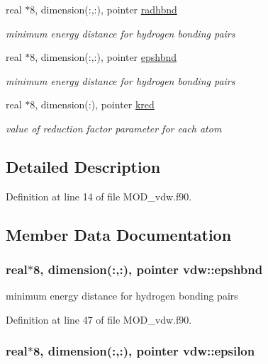 \begin{DoxyCompactItemize}
real $\ast$8, dimension(\-:,\-:), pointer \hyperlink{classvdw_ab306f3aa073b7317272454203b2dc5e7}{radhbnd}
\begin{DoxyCompactList}\small\item\em minimum energy distance for hydrogen bonding pairs \end{DoxyCompactList}\item 
real $\ast$8, dimension(\-:,\-:), pointer \hyperlink{classvdw_a9cb813f75d80f7bd7d0569e1ad7d92ad}{epshbnd}
\begin{DoxyCompactList}\small\item\em minimum energy distance for hydrogen bonding pairs \end{DoxyCompactList}\item 
real $\ast$8, dimension(\-:), pointer \hyperlink{classvdw_ad85a1ffa2bf6310e38c7a3fd6ac8256b}{kred}
\begin{DoxyCompactList}\small\item\em value of reduction factor parameter for each atom \end{DoxyCompactList}\end{DoxyCompactItemize}


\subsection{Detailed Description}


Definition at line 14 of file M\-O\-D\-\_\-vdw.\-f90.



\subsection{Member Data Documentation}
\hypertarget{classvdw_a9cb813f75d80f7bd7d0569e1ad7d92ad}{
\subsubsection[{epshbnd}]{\setlength{\rightskip}{0pt plus 5cm}real$\ast$8, dimension(\-:,\-:), pointer vdw\-::epshbnd}}\label{classvdw_a9cb813f75d80f7bd7d0569e1ad7d92ad}


minimum energy distance for hydrogen bonding pairs 



Definition at line 47 of file M\-O\-D\-\_\-vdw.\-f90.

\hypertarget{classvdw_a429fafea5721eb9044615b9d14c6c652}{
\subsubsection[{epsilon}]{\setlength{\rightskip}{0pt plus 5cm}real$\ast$8, dimension(\-:,\-:), pointer vdw\-::epsilon}}\label{classvdw_a429fafea5721eb9044615b9d14c6c652}


